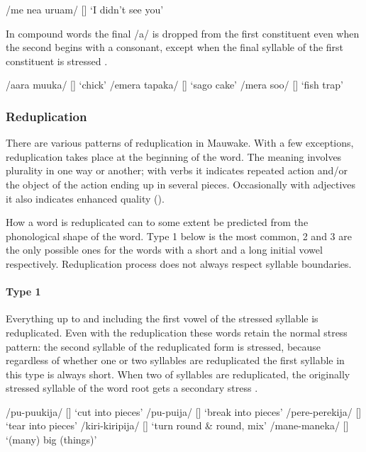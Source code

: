 \ea
\label{ex:2:stressedelision}
/me ne{\textphi}a uru{\textphi}am/  []  `I didn't see you'
\z

In compound words the final /a/ is dropped from the first constituent even when the second begins with a consonant, except when the final syllable of the first constituent is stressed .  

\ea
\label{ex:2:compoundelision}
\ea
/aara muuka/  []  `chick'
\ex
/emera tapaka/  []  `sago cake'
\ex
/mera soo/  []  `fish trap'
\z
\z

\subsubsection{Reduplication}\label{sec:2.3.3.2}

There are various patterns of reduplication in Mauwake. With a few exceptions, reduplication takes place at the beginning of the word.  The meaning involves plurality in one way or another; with verbs it indicates repeated action and/or the object of the action ending up in several pieces. Occasionally with adjectives it also indicates enhanced quality ().

How a word is reduplicated can to some extent be predicted from the phonological shape of the word.  Type 1 below is the most common, 2 and 3 are the only possible ones for the words with a short and a long initial vowel respectively.  Reduplication process does not always respect syllable boundaries.

\paragraph[Type 1]{Type 1}

Everything up to and including the first vowel of the stressed syllable is reduplicated.  Even with the reduplication these words retain the normal stress pattern: the second syllable of the reduplicated form is stressed, because regardless of whether one or two syllables are reduplicated the first syllable in this type is always short. When two of syllables are reduplicated, the originally stressed syllable of the word root gets a secondary stress .

\ea
\label{ex:2:reduptypeone}
\ea
/pu-puukija/  []  `cut into pieces'
\ex
/pu-puija/  []  `break into pieces'
\ex
/pere-perekija/  []  `tear into pieces'
\ex
/kiri-kiripija/  []  `turn round \& round, mix'
\ex
/mane-maneka/  []  `(many) big (things)'
\z
\z


